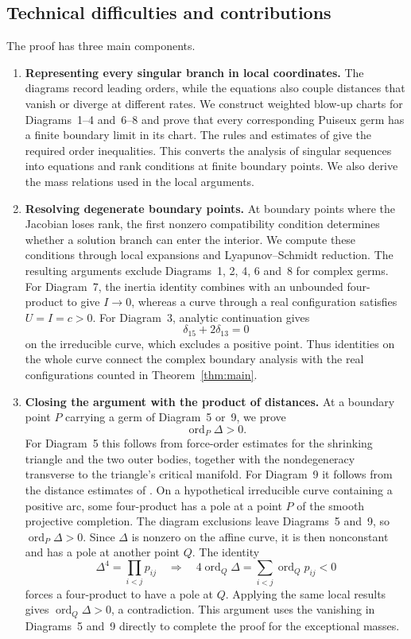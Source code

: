 \documentclass[Threeside,11pt]{article}
\theoremstyle{definition}
\theoremstyle{remark}
\numberwithin{equation}{section}
\theoremstyle{remark}
\newcommand{\ord}{\operatorname{ord}}
\begin{document}
\subsection*{Technical difficulties and contributions}
The proof has three main components.
\begin{enumerate}[label=\textup{(\arabic*)}]
\item \textbf{Representing every singular branch in local coordinates.}
The diagrams record leading orders, while the equations also couple distances
that vanish or diverge at different rates. We construct weighted blow-up
charts for Diagrams~1--4 and~6--8 and prove that every corresponding Puiseux
germ has a finite boundary limit in its chart. The rules and estimates of
\cite[\S3]{AK} give the required order inequalities. This converts the analysis
of singular sequences into equations and rank conditions at finite boundary
points. We also derive the mass relations used in the local arguments.

\item \textbf{Resolving degenerate boundary points.}
At boundary points where the Jacobian loses rank, the first nonzero
compatibility condition determines whether a solution branch can enter the
interior. We compute these conditions through local expansions and
Lyapunov--Schmidt reduction. The resulting arguments exclude Diagrams~1, 2, 4,
6 and~8 for complex germs. For Diagram~7, the inertia identity combines with
an unbounded four-product to give $I\to0$, whereas a curve through a real
configuration satisfies $U=I=c>0$. For Diagram~3, analytic continuation gives
\[
 \delta_{15}+2\delta_{13}=0
\]
on the irreducible curve, which excludes a positive point. Thus identities on
the whole curve connect the complex boundary analysis with the real
configurations counted in Theorem~\ref{thm:main}.

\item \textbf{Closing the argument with the product of distances.}
At a boundary point $P$ carrying a germ of Diagram~5 or~9, we prove
\[
 \ord_P\Delta>0.
\]
For Diagram~5 this follows from force-order estimates for the shrinking
triangle and the two outer bodies, together with the nondegeneracy transverse
to the triangle's critical manifold. For Diagram~9 it follows from the
distance estimates of \cite[\S8.9]{AK}. On a hypothetical irreducible curve
containing a positive arc, some four-product has a pole at a point $P$ of the
smooth projective completion. The diagram exclusions leave Diagrams~5 and~9,
so $\ord_P\Delta>0$. Since $\Delta$ is nonzero on the affine curve, it is then
nonconstant and has a pole at another point $Q$. The identity
\[
 \Delta^4=\prod_{i<j}p_{ij}
 \quad\Longrightarrow\quad
 4\ord_Q\Delta=\sum_{i<j}\ord_Qp_{ij}<0
\]
forces a four-product to have a pole at $Q$. Applying the same local results
gives $\ord_Q\Delta>0$, a contradiction. This argument uses the vanishing in
Diagrams~5 and~9 directly to complete the proof for the exceptional masses.
\end{enumerate}
\end{document}
